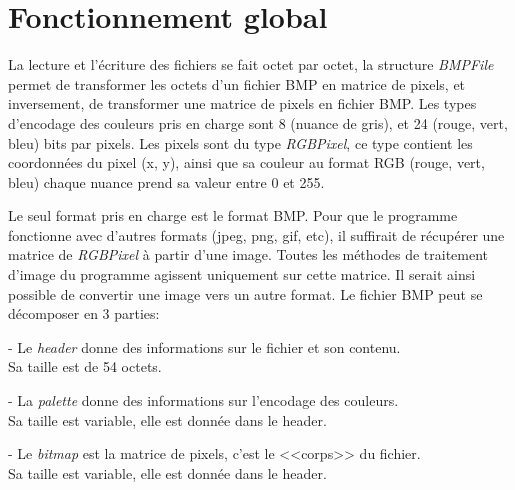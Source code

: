 \documentclass{article}
\begin{document}
		\section{Fonctionnement global}
			La lecture et l'écriture des fichiers se fait octet par octet, la structure \emph{BMPFile} permet de transformer les octets d'un fichier BMP en matrice de pixels, et inversement, de transformer une matrice de pixels en fichier BMP. Les types d'encodage des couleurs pris en charge sont 8 (nuance de gris), et 24 (rouge, vert, bleu) bits par pixels. Les pixels sont du type \emph{RGBPixel}, ce type contient les coordonnées du pixel (x, y), ainsi que sa couleur au format RGB (rouge, vert, bleu) chaque nuance prend sa valeur entre 0 et 255.
			\\\par Le seul format pris en charge est le format BMP. Pour que le programme fonctionne avec d'autres formats (jpeg, png, gif, etc), il suffirait de récupérer une matrice de \emph{RGBPixel} à partir d'une image. Toutes les méthodes de traitement d'image du programme agissent uniquement sur cette matrice. Il serait ainsi possible de convertir une image vers un autre format. Le fichier BMP peut se décomposer en 3 parties:
			\begin{description}
				\item - Le \emph{header} donne des informations sur le fichier et son contenu. \hfill\\
					Sa taille est de 54 octets.
				\item - La \emph{palette} donne des informations sur l'encodage des couleurs. \hfill\\
					Sa taille est variable, elle est donnée dans le header.
				\item - Le \emph{bitmap} est la matrice de pixels, c'est le <<corps>> du fichier. \hfill\\
					Sa taille est variable, elle est donnée dans le header.
			\end{description}
		
		
\end{document}
